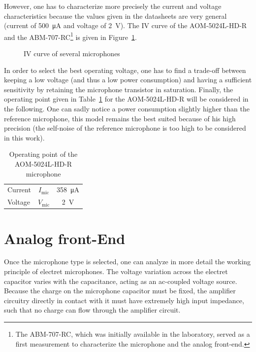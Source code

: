 \documentclass{EPL-master-thesis-covers-EN}
\newcommand{\te}[1]{\textrm{#1}}
\begin{document}
However, one has to characterize more precisely the current and voltage characteristics because the values given in the datasheets are very general (current of \SI{500}{\micro A} and voltage of \SI{2}{V}). The IV curve of the AOM-5024L-HD-R and the ABM-707-RC\footnote{The ABM-707-RC, which was initially available in the laboratory, served as a first measurement to characterize the microphone and the analog front-end.} is given in Figure~\ref{fig:IV_mic}.

\begin{figure}[H]
    \centering
    
    \caption{IV curve of several microphones}
    \label{fig:IV_mic}
\end{figure}



In order to select the best operating voltage, one has to find a trade-off between keeping a low voltage (and thus a low power consumption) and having a sufficient sensitivity by retaining the microphone transistor in saturation. Finally, the operating point given in Table~\ref{tab:op_point_mic} for the AOM-5024L-HD-R will be considered in the following. One can sadly notice a power consumption slightly higher than the reference microphone, this model remains the best suited because of his high precision (the self-noise of the reference microphone is too high to be considered in this work).

\begin{table}[H]
\centering
\begin{tabular}{lcc}
\toprule
 Current & $I_{\te{mic}}$   & \SI{358}{\micro A} \\
 Voltage & $V_{\te{mic}}$   & \SI{2}{V}          \\ \bottomrule
\end{tabular}
\caption{Operating point of the AOM-5024L-HD-R microphone}
\label{tab:op_point_mic}
\end{table}

\section{Analog front-End}
\label{section:AFE}

Once the microphone type is selected, one can analyze in more detail the working principle of electret microphones.
The voltage variation across the electret capacitor varies with the capacitance, acting as an ac-coupled voltage source. Because the charge on the microphone capacitor must be fixed, the amplifier circuitry directly in contact with it must have extremely high input impedance, such that no charge can flow through the amplifier circuit. 
\end{document}
